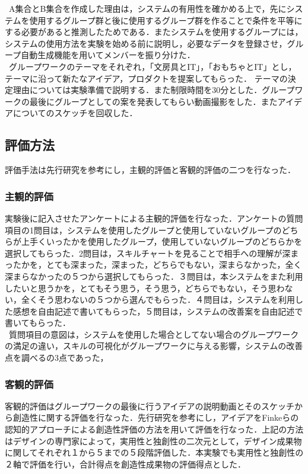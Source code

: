 \documentclass{funthesis}
\begin{document}
\ A集合とB集合を作成した理由は，システムの有用性を確かめる上で，先にシステムを使用するグループ群と後に使用するグループ群を作ることで条件を平等にする必要があると推測したためである．またシステムを使用するグループには，システムの使用方法を実験を始める前に説明し，必要なデータを登録させ，グループ自動生成機能を用いてメンバーを振り分けた．\\
\ グループワークのテーマをそれぞれ，「文房具とIT」，「おもちゃとIT」とし，テーマに沿って新たなアイデア，プロダクトを提案してもらった．
テーマの決定理由については実験準備で説明する．また制限時間を30分とした．グループワークの最後にグループとしての案を発表してもらい動画撮影をした．またアイデアについてのスケッチを回収した．

\subsection{評価方法}
評価手法は先行研究\cite{A17}を参考にし，主観的評価と客観的評価の二つを行なった．
\subsubsection{主観的評価}
実験後に記入させたアンケートによる主観的評価を行なった．アンケートの質問項目の1問目は，システムを使用したグループと使用していないグループのどちらが上手くいったかを使用したグループ，使用していないグループのどちらかを選択してもらった．2問目は，スキルチャートを見ることで相手への理解が深まったかを，とても深まった，深まった，どちらでもない，深まらなかった，全く深まらなかったの５つから選択してもらった．３問目は，本システムをまた利用したいと思うかを，とてもそう思う，そう思う，どちらでもない，そう思わない，全くそう思わないの５つから選んでもらった．４問目は，システムを利用した感想を自由記述で書いてもらった，５問目は，システムの改善案を自由記述で書いてもらった．\\
\ 質問項目の意図は，システムを使用した場合としてない場合のグループワークの満足の違い，スキルの可視化がグループワークに与える影響，システムの改善点を調べるの3点であった，　　　　　　　　　　　　　　　　　　　　　　　　　　　　　　　　　　　　　　　　　　　　　　　　　　　　　　　　　
\subsubsection{客観的評価}
客観的評価はグループワークの最後に行うアイデアの説明動画とそのスケッチから創造性に関する評価を行なった．先行研究\cite{A18}を参考にし，アイデアをFinkeら\cite{A19}の認知的アプローチによる創造性評価の方法を用いて評価を行なった．上記の方法はデザインの専門家によって，実用性と独創性の二次元として，デザイン成果物に関してそれぞれ１から５までの５段階評価した．本実験でも実用性と独創性の２軸で評価を行い，合計得点を創造性成果物の評価得点とした．
\end{document}
